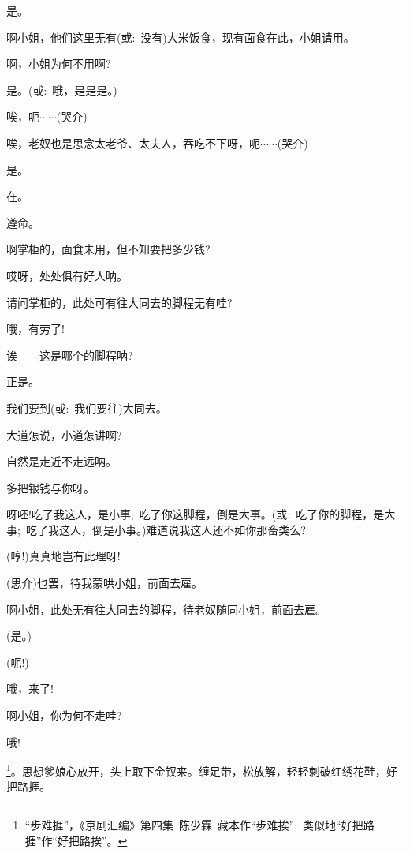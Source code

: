 {{是。}

{啊小姐，他们这里无有({\akai 或}:~没有)大米饭食，现有面食在此，小姐请用。}

{啊，小姐为何不用啊?}

{是。({\akai 或}:~哦，是是是。)}

{唉，呃$\cdots{}\cdots{}$({\hwfs 哭介})}

{唉，老奴也是思念太老爷、太夫人，吞吃不下呀，呃$\cdots{}\cdots{}$({\hwfs 哭介})}

{是。}

{在。}

{遵命。}

{啊掌柜的，面食未用，但不知要把多少钱?}

{哎呀，处处俱有好人呐。}

{请问掌柜的，此处可有往大同去的脚程无有哇?}

{哦，有劳了!}

{诶------这是哪个的脚程呐?}

{正是。}

{我们要到({\akai 或}:~我们要往)大同去。}

{大道怎说，小道怎讲啊?}

{自然是走近不走远呐。}

{多把银钱与你呀。}

{呀呸!吃了我这人，是小事;~吃了你这脚程，倒是大事。({\akai 或}:~吃了你的脚程，是大事;~吃了我这人，倒是小事。)难道说我这人还不如你那畜类么?}

{(哼!)真真地岂有此理呀!}

{({\hwfs 思介})也罢，待我蒙哄小姐，前面去雇。}

{啊小姐，此处无有往大同去的脚程，待老奴随同小姐，前面去雇。}

{(是。)}

{(呃!)}



{哦，来了!}

{\vspace{5pt}}

{啊小姐，你为何不走哇?}

{哦!}

\footnote{``步难捱''，《京剧汇编》第四集~陈少霖~藏本作``步难挨'';~类似地``好把路捱''作``好把路挨''。}{。思想爹娘心放开，头上取下金钗来。缠足带，松放解，轻轻刺破红绣花鞋，好把路捱。}

}

